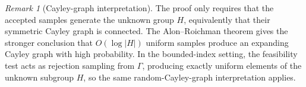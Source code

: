 \documentclass[11pt]{article}
\theoremstyle{plain}
\theoremstyle{definition}
\theoremstyle{remark}
\newtheorem{remark}[theorem]{Remark}
\begin{document}
\begin{remark}[Cayley-graph interpretation]
The proof only requires that the accepted samples generate the unknown group
\(H\), equivalently that their symmetric Cayley graph is connected. The
Alon--Roichman theorem gives the stronger conclusion that
\(O(\log|H|)\) uniform samples produce an expanding Cayley graph with high
probability. In the bounded-index setting, the feasibility test acts as
rejection sampling from \(\Gamma\), producing exactly uniform elements of the
unknown subgroup \(H\), so the same random-Cayley-graph interpretation
applies.
\end{remark}
 



 










\end{document}
